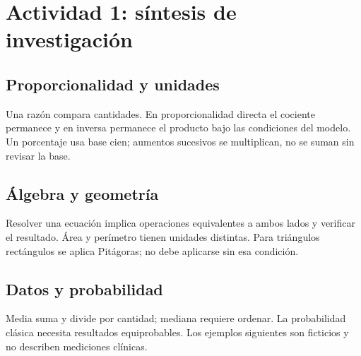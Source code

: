 \def\uadectitulo{Pensamiento matemático}


\portadaUAdeC
\section{Actividad 1: síntesis de investigación}
\subsection{Proporcionalidad y unidades}
Una razón compara cantidades. En proporcionalidad directa el cociente permanece y en inversa permanece el producto bajo las condiciones del modelo. Un porcentaje usa base cien; aumentos sucesivos se multiplican, no se suman sin revisar la base.
\subsection{Álgebra y geometría}
Resolver una ecuación implica operaciones equivalentes a ambos lados y verificar el resultado. Área y perímetro tienen unidades distintas. Para triángulos rectángulos se aplica Pitágoras; no debe aplicarse sin esa condición.
\subsection{Datos y probabilidad}
Media suma y divide por cantidad; mediana requiere ordenar. La probabilidad clásica necesita resultados equiprobables. Los ejemplos siguientes son ficticios y no describen mediciones clínicas.
